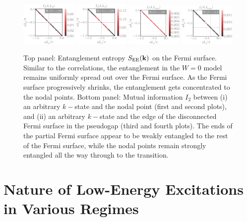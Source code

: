 \documentclass[reprint,hidelinks,onecolumn]{revtex4-2}
\begin{document}
\begin{figure}[htpb]
	\includegraphics[width=0.24\textwidth]{tiled_I2_k_N-1.pdf}
	\includegraphics[width=0.24\textwidth]{tiled_I2_k_N-2.pdf}
	\includegraphics[width=0.24\textwidth]{tiled_I2_k_edge-2.pdf}
	\includegraphics[width=0.24\textwidth]{tiled_I2_k_edge-3.pdf}
	\caption{Top panel: Entanglement entropy \(S_\text{EE}({\bf k})\) on the Fermi surface. Similar to the correlations, the entanglement in the \(W=0\) model remains uniformly spread out over the Fermi surface. As the Fermi surface progressively shrinks, the entanglement gets concentrated to the nodal points. Bottom panel: Mutual information \(I_2\) between (i) an arbitrary \(k-\)state and the nodal point (first and second plots), and (ii) an arbitrary \(k-\)state and the edge of the disconnected Fermi surface in the pseudogap (third and fourth plots). The ends of the partial Fermi surface appear to be weakly entangled to the rest of the Fermi surface, while the nodal points remain strongly entangled all the way through to the transition.}
	\label{tiledEntanglement}
\end{figure}

\section{Nature of Low-Energy Excitations in Various Regimes}
\end{document}
